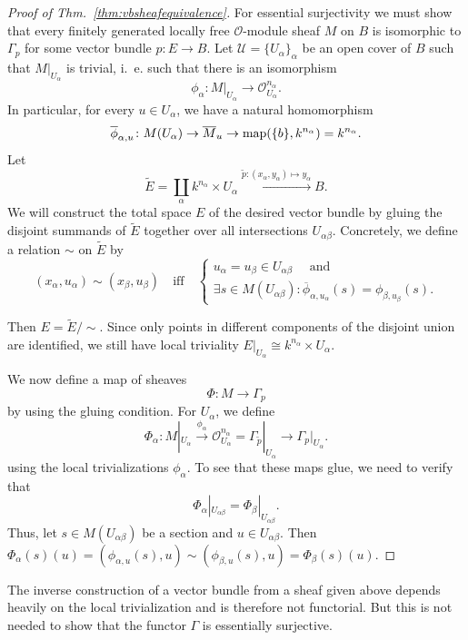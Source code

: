 \documentclass[a4paper,openany]{scrbook}
\begin{document}
\begin{proof}[Proof of Thm.~\ref{thm:vbsheafequivalence}]
For essential surjectivity we must show that every finitely generated locally free $\mathcal O$-module sheaf $M$ on $B$ is isomorphic to $\Gamma_p$ for some vector bundle $p\colon E\to B$. Let $\mathcal U = \{U_\alpha\}_\alpha$ be an open cover of $B$ such that $ M|_{U_\alpha}$ is trivial, i.~e. such that there is an isomorphism
\[
\phi_\alpha\colon  M|_{U_\alpha} \to \mathcal O_{U_\alpha}^{n_\alpha}.
\]
In particular, for every $u \in U_\alpha$, we have a natural homomorphism
\[
\overline \phi_{\alpha,u}\colon M(U_\alpha) \to \overline M_u \to \operatorname{map}(\{b\},k^{n_\alpha}) = k^{n_\alpha}.
\]
Let
\[
\tilde E = \coprod_{\alpha} k^{n_\alpha} \times U_\alpha \xrightarrow{\tilde p\colon (x_\alpha,y_\alpha) \mapsto y_\alpha} B.
\]
We will construct the total space $E$ of the desired vector bundle by gluing the disjoint summands of $\tilde E$ together over all intersections $U_{\alpha\beta}$. Concretely, we define a relation $\sim$ on $\tilde E$ by
\[
(x_\alpha,u_\alpha) \sim (x_\beta,u_\beta) \quad \text{iff} \quad \left\{\begin{matrix}
u_\alpha=u_\beta \in U_{\alpha\beta} \quad\text{ and }\\
\exists s \in M(U_{\alpha\beta})\colon \overline \phi_{\alpha,u_\alpha}(s) = \phi_{\beta,u_\beta}(s).\end{matrix}\right.
\]

Then $E = \tilde E/\sim$. Since only points in different components of the disjoint union are identified, we still have local triviality $E|_{U_\alpha} \cong k^{n_\alpha} \times U_\alpha$. 

We now define a map of sheaves
\[
\Phi\colon M \to \Gamma_p
\]
by using the gluing condition. For $U_\alpha$, we define
\[
\Phi_\alpha\colon M|_{U_\alpha} \xrightarrow{\phi_\alpha} \mathcal O_{U_\alpha}^{n_\alpha} = \Gamma_{\tilde p}|_{U_\alpha} \to \Gamma_p|_{U_\alpha}.
\]
using the local trivializations $\phi_\alpha$. To see that these maps glue, we need to verify that
\[
\Phi_\alpha|_{U_{\alpha\beta}} = \Phi_\beta|_{U_{\alpha\beta}}.
\]
Thus, let $s \in M(U_{\alpha\beta})$ be a section and $u \in U_{\alpha\beta}$. Then $\Phi_\alpha(s)(u) = (\phi_{\alpha,u}(s),u) \sim (\phi_{\beta,u}(s),u) = \Phi_\beta(s)(u)$.
\end{proof}

\begin{remark}
The inverse construction of a vector bundle from a sheaf given above depends heavily on the local trivialization and is therefore not functorial. But this is not needed to show that the functor $\Gamma$ is essentially surjective.
\end{remark}
\end{document}
